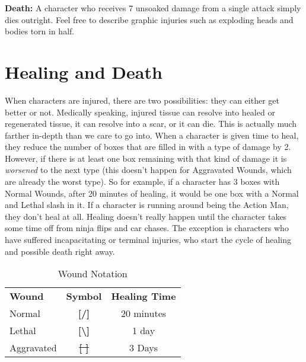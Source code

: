 \textbf{Death:} A character who receives 7 unsoaked damage from a single attack simply dies outright. Feel free to describe graphic injuries such as exploding heads and bodies torn in half.

\section{Healing and Death}

When characters are injured, there are two possibilities: they can either get better or not. Medically speaking, injured tissue can resolve into healed or regenerated tissue, it can resolve into a scar, or it can die. This is actually much farther in-depth than we care to go into. When a character is given time to heal, they reduce the number of boxes that are filled in with a type of damage by 2. However, if there is at least one box remaining with that kind of damage it is \textit{worsened} to the next type (this doesn't happen for Aggravated Wounds, which are already the worst type). So for example, if a character has 3 boxes with Normal Wounds, after 20 minutes of healing, it would be one box with a Normal and Lethal slash in it. If a character is running around being the Action Man, they don't heal at all. Healing doesn't really happen until the character takes some time off from ninja flips and car chases. The exception is characters who have suffered incapacitating or terminal injuries, who start the cycle of healing and possible death right away.

\begin{wraptable}{R}{7.3cm} \vspace{-.3cm}
 \caption{Wound Notation} \centering
\begin{tabular}{l c c}
\textbf{Wound}&\textbf{Symbol}&\textbf{Healing Time}\\
Normal&\textbf{[/]}&20 minutes\\
Lethal&\textbf{[\textbackslash]}&1 day\\
Aggravated&\textbf{\sout{[ ]}}&3 Days\\
\end{tabular}
\end{wraptable}

